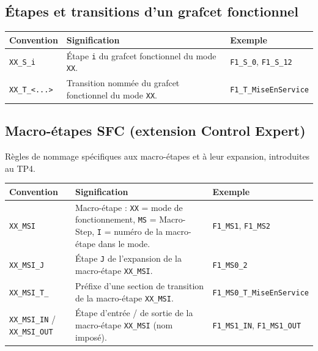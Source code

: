 \subsection{Étapes et transitions d'un grafcet fonctionnel}

\begin{center}
    \begin{tabular}{|p{3.4cm}|p{6.6cm}|p{4.2cm}|}
        \hline
        \textbf{Convention} & \textbf{Signification} & \textbf{Exemple} \\
        \hline
        \texttt{XX\_S\_i} & Étape \texttt{i} du grafcet fonctionnel du mode \texttt{XX}. & \texttt{F1\_S\_0}, \texttt{F1\_S\_12} \\
        \hline
        \texttt{XX\_T\_<...>} & Transition nommée du grafcet fonctionnel du mode \texttt{XX}. & \texttt{F1\_T\_MiseEnService} \\
        \hline
    \end{tabular}
\end{center}

\subsection{Macro-étapes SFC (extension Control Expert)}

Règles de nommage spécifiques aux macro-étapes et à leur expansion, introduites au TP4.

\begin{center}
    \begin{tabular}{|p{3.4cm}|p{6.6cm}|p{4.2cm}|}
        \hline
        \textbf{Convention} & \textbf{Signification} & \textbf{Exemple} \\
        \hline
        \texttt{XX\_MSI} & Macro-étape : \texttt{XX} = mode de fonctionnement, \texttt{MS} = Macro-Step, \texttt{I} = numéro de la macro-étape dans le mode. & \texttt{F1\_MS1}, \texttt{F1\_MS2} \\
        \hline
        \texttt{XX\_MSI\_J} & Étape \texttt{J} de l'expansion de la macro-étape \texttt{XX\_MSI}. & \texttt{F1\_MS0\_2} \\
        \hline
        \texttt{XX\_MSI\_T\_} & Préfixe d'une section de transition de la macro-étape \texttt{XX\_MSI}. & \texttt{F1\_MS0\_T\_MiseEnService} \\
        \hline
        \texttt{XX\_MSI\_IN} / \texttt{XX\_MSI\_OUT} & Étape d'entrée / de sortie de la macro-étape \texttt{XX\_MSI} (nom imposé). & \texttt{F1\_MS1\_IN}, \texttt{F1\_MS1\_OUT} \\
        \hline
    \end{tabular}
\end{center}
